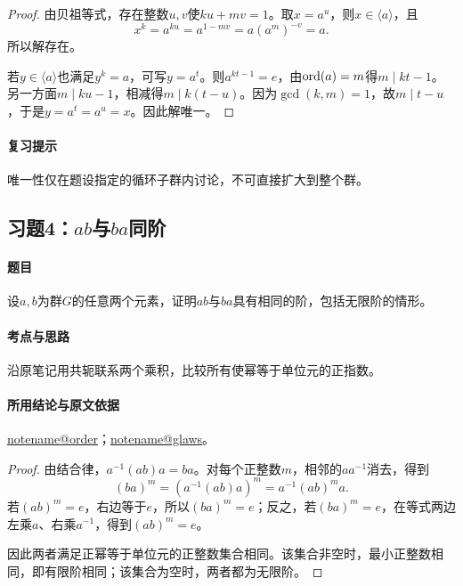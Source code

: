 \documentclass[UTF8,a4paper,11pt,fontset=windows]{ctexart}
\makeatletter
\newcommand{\noteref}[1]{\hyperref[note:#1]{\csname notename@#1\endcsname}}
\newcommand{\exref}[2]{\hyperref[ex:#1:#2]{第#1章习题#2}}
\makeatother
\begin{document}

\begin{proof}
由贝祖等式，存在整数$u,v$使$ku+mv=1$。取$x=a^u$，则$x\in\langle a\rangle$，且
\[
x^k=a^{ku}=a^{1-mv}=a(a^m)^{-v}=a.
\]
所以解存在。

若$y\in\langle a\rangle$也满足$y^k=a$，可写$y=a^t$。则$a^{kt-1}=e$，由$\operatorname{ord}(a)=m$得$m\mid kt-1$。另一方面$m\mid ku-1$，相减得$m\mid k(t-u)$。因为$\gcd(k,m)=1$，故$m\mid t-u$，于是$y=a^t=a^u=x$。因此解唯一。
\end{proof}

\paragraph{复习提示}
唯一性仅在题设指定的循环子群内讨论，不可直接扩大到整个群。


\subsection{习题4：\texorpdfstring{$ab$与$ba$同阶}{ab与ba同阶}}
\label{ex:2:4}

\paragraph{题目}
设$a,b$为群$G$的任意两个元素，证明$ab$与$ba$具有相同的阶，包括无限阶的情形。

\paragraph{考点与思路}
沿原笔记用共轭联系两个乘积，比较所有使幂等于单位元的正指数。

\paragraph{所用结论与原文依据}
\noteref{order}；\noteref{glaws}。


\begin{proof}
由结合律，$a^{-1}(ab)a=ba$。对每个正整数$m$，相邻的$aa^{-1}$消去，得到
\[
(ba)^m=(a^{-1}(ab)a)^m=a^{-1}(ab)^ma.
\]
若$(ab)^m=e$，右边等于$e$，所以$(ba)^m=e$；反之，若$(ba)^m=e$，在等式两边左乘$a$、右乘$a^{-1}$，得到$(ab)^m=e$。

因此两者满足正幂等于单位元的正整数集合相同。该集合非空时，最小正整数相同，即有限阶相同；该集合为空时，两者都为无限阶。
\end{proof}
\end{document}
